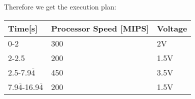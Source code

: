 \documentclass{article}
\begin{document}
	\begin{adjustwidth}{2em}{2em}
		Therefore we get the execution plan: \\
		\begin{tabular}{|l|l|l|}
			\hline
			\rowcolor{gray!80} Time[s] & Processor Speed [MIPS] & Voltage \\
			\hline
			0-2 & 300 & 2V \\
			2-2.5 & 200 & 1.5V \\
			2.5-7.9$\overline{4}$ & 450 & 3.5V \\
			7.9$\overline{4}$-16.9$\overline{4}$ & 200 & 1.5V \\
			\hline
		\end{tabular}
	\end{adjustwidth}
\end{document}
